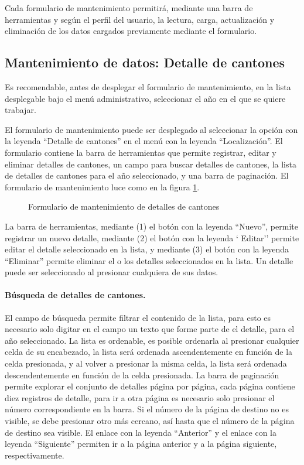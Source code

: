 \documentclass[a4paper, 9pt, conference]{article}              %
\begin{document}
Cada formulario de mantenimiento permitir\'a, mediante una barra de herramientas y seg\'un el perfil del usuario, la lectura, carga, actualizaci\'on y eliminaci\'on de los datos cargados previamente mediante el formulario.

\subsection{Mantenimiento de datos: Detalle de cantones}
Es recomendable, antes de desplegar el formulario de mantenimiento, en la lista desplegable bajo el men\'u administrativo, seleccionar el a\~no en el que se quiere trabajar.

El formulario de mantenimiento puede ser desplegado al seleccionar la opci\'on con la leyenda ``Detalle de cantones'' en el men\'u con la leyenda ``Localizaci\'on''. El formulario contiene la barra de herramientas que permite registrar, editar y eliminar detalles de cantones, un campo para buscar detalles de cantones, la lista de detalles de cantones para el a\~no seleccionado, y una barra de paginaci\'on. El formulario de mantenimiento luce como en la figura \ref{fig:geocantonsdetail}.

\begin{figure}
	\centering
		\caption{Formulario de mantenimiento de detalles de cantones}
	\label{fig:geocantonsdetail}
\end{figure}

La barra de herramientas, mediante (1) el bot\'on con la leyenda ``Nuevo'', permite registrar un nuevo detalle, mediante (2) el bot\'on con la leyenda ` Editar'' permite editar el detalle seleccionado en la lista, y mediante (3) el bot\'on con la leyenda ``Eliminar'' permite eliminar el o los detalles seleccionados en la lista. Un detalle puede ser seleccionado al presionar cualquiera de sus datos.

\paragraph{B\'usqueda de detalles de cantones.}

El campo de b\'usqueda permite filtrar el contenido de la lista, para esto es necesario solo digitar en el campo un texto que forme parte de el detalle, para el a\~no seleccionado. La lista es ordenable, es posible ordenarla al presionar cualquier celda de su encabezado, la lista ser\'a ordenada ascendentemente en funci\'on de la celda presionada, y al volver a presionar la misma celda, la lista ser\'a ordenada descendentemente en funci\'on de la celda presionada. La barra de paginaci\'on permite explorar el conjunto de detalles p\'agina por p\'agina, cada p\'agina contiene diez registros de detalle, para ir a otra p\'agina es necesario solo presionar el n\'umero correspondiente en la barra. Si el n\'umero de la p\'agina de destino no es visible, se debe presionar otro m\'as cercano, as\'i hasta que el n\'umero de la p\'agina de destino sea visible. El enlace con la leyenda ``Anterior'' y el enlace con la leyenda ``Siguiente'' permiten ir a la p\'agina anterior y a la p\'agina siguiente, respectivamente.
\end{document}
